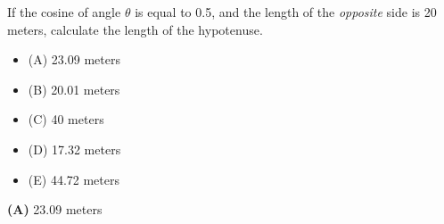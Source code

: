 

If the cosine of angle $\theta$ is equal to 0.5, and the length of the {\it opposite} side is 20 meters, calculate the length of the hypotenuse.

\begin{itemize}
\item{(A)} 23.09 meters
\vskip 5pt 
\item{(B)} 20.01 meters
\vskip 5pt 
\item{(C)} 40 meters
\vskip 5pt 
\item{(D)} 17.32 meters
\vskip 5pt 
\item{(E)} 44.72 meters
\end{itemize}







{\bf (A)} 23.09 meters
 










